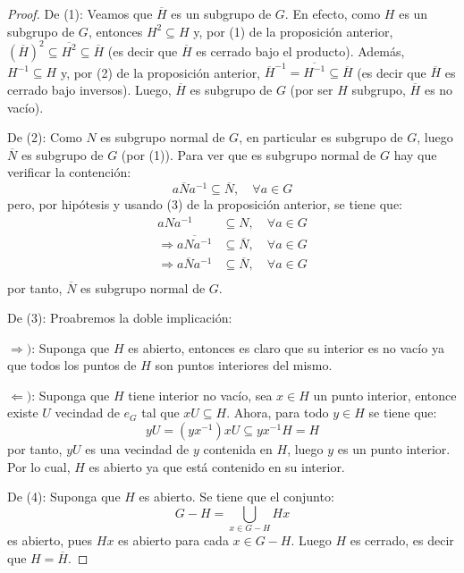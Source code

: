\documentclass[12pt]{report}
\theoremstyle{largebreak}
\newcommand{\Cls}[1]{\ensuremath{\overline{#1}}}
\begin{document}
    \begin{proof}
        De (1): Veamos que $\Cls{H}$ es un subgrupo de $G$. En efecto, como $H$ es un subgrupo de $G$, entonces $H^2\subseteq H$ y, por (1) de la proposición anterior, $\left(\Cls{H}\right)^2\subseteq\Cls{H^2}\subseteq \Cls{H}$ (es decir que $\Cls{H}$ es cerrado bajo el producto). Además, $H^{-1}\subseteq H$ y, por (2) de la proposición anterior, $\Cls{H}^{-1}=\Cls{H^{-1}}\subseteq \Cls{H}$ (es decir que $\Cls{H}$ es cerrado bajo inversos). Luego, $\Cls{H}$ es subgrupo de $G$ (por ser $H$ subgrupo, $\Cls{H}$ es no vacío).

        De (2): Como $N$ es subgrupo normal de $G$, en particular es subgrupo de $G$, luego $\Cls{N}$ es subgrupo de $G$ (por (1)). Para ver que es subgrupo normal de $G$ hay que verificar la contención:
        \begin{equation*}
            a\Cls{N}a^{-1}\subseteq\Cls{N},\quad\forall a\in G
        \end{equation*}
        pero, por hipótesis y usando (3) de la proposición anterior, se tiene que:
        \begin{equation*}
            \begin{split}
                aNa^{-1}&\subseteq N,\quad\forall a\in G\\
                \Rightarrow \Cls{aNa^{-1}}&\subseteq \Cls{N},\quad\forall a\in G\\
                \Rightarrow a\Cls{N}a^{-1}&\subseteq \Cls{N},\quad\forall a\in G\\
            \end{split}
        \end{equation*}
        por tanto, $\Cls{N}$ es subgrupo normal de $G$.

        De (3): Proabremos la doble implicación:

        $\Rightarrow)$: Suponga que $H$ es abierto, entonces es claro que su interior es no vacío ya que todos los puntos de $H$ son puntos interiores del mismo.

        $\Leftarrow)$: Suponga que $H$ tiene interior no vacío, sea $x\in H$ un punto interior, entonce existe $U$ vecindad de $e_G$ tal que $xU\subseteq H$. Ahora, para todo $y\in H$ se tiene que:
        \begin{equation*}
            yU= (yx^{-1})xU\subseteq yx^{-1}H=H
        \end{equation*}
        por tanto, $yU$ es una vecindad de $y$ contenida en $H$, luego $y$ es un punto interior. Por lo cual, $H$ es abierto ya que está contenido en su interior.

        De (4): Suponga que $H$ es abierto. Se tiene que el conjunto:
        \begin{equation*}
            G-H=\bigcup_{x\in G-H}Hx
        \end{equation*}
        es abierto, pues $Hx$ es abierto para cada $x\in G-H$. Luego $H$ es cerrado, es decir que $H=\Cls{H}$.

    \end{proof}
\end{document}
